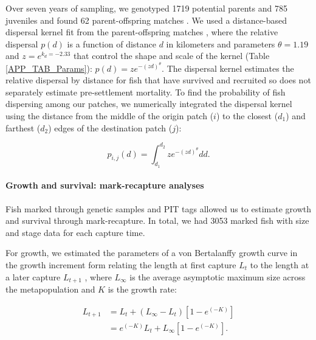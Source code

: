 \documentclass[12pt, oneside]{article}   	%
\begin{document}
Over seven years of sampling, we genotyped 1719 potential parents and 785 juveniles and found 62 parent-offspring matches \citep{catalanoInPrepconnectivity}.
We used a distance-based dispersal kernel fit from the parent-offspring matches \citep{catalanoInPrepconnectivity, bode2018estimating}, where the relative dispersal $p(d)$ is a function of distance $d$ in kilometers and parameters $\theta = 1.19$ and $z = e^{k_d = -2.33}$ that control the shape and scale of the kernel (Table \ref{APP_TAB_Params}): $p(d) = ze^{-(zd)^\theta}$. The dispersal kernel estimates the relative dispersal by distance for fish that have survived and recruited so does not separately estimate pre-settlement mortality. To find the probability of fish dispersing among our patches, we numerically integrated the dispersal kernel using the distance from the middle of the origin patch ($i$) to the closest ($d_1$) and farthest ($d_2$) edges of the destination patch ($j$):

\begin{equation} %
p_{i, j}(d) = \int_{d_1}^{d_2} z e^{-(zd)^\theta}  dd. \label{EQN_integratingDK}
\end{equation}

\paragraph*{Growth and survival: mark-recapture analyses}

Fish marked through genetic samples and PIT tags allowed us to estimate growth and survival through mark-recapture. In total, we had 3053 marked fish with size and stage data for each capture time. 

For growth, we estimated the parameters of a von Bertalanffy growth curve in the growth increment form relating the length at first capture $L_t$ to the length at a later capture $L_{t+1}$ \citep{hart2009estimating}, where $L_\infty$ is the average asymptotic maximum size across the metapopulation and $K$ is the growth rate: %

\begin{equation} \label{EQN_VBL} 
\begin{split}
L_{t+1} & = L_t + (L_\infty - L_t)[1 - e^{(-K)}] \\
 & = e^{(-K)}L_t + L_\infty[1 - e^{(-K)}].
\end{split}
\end{equation}
\end{document}
